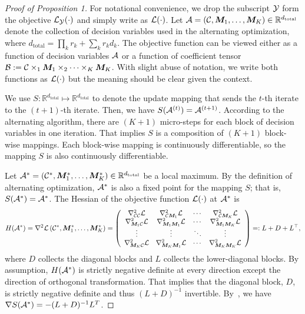\documentclass[11pt]{article}
\theoremstyle{plain}
\theoremstyle{definition}
\begin{document}
\begin{proof}[Proof of Proposition 1]
For notational convenience, we drop the subscript $\mathcal{Y}$ form the objective $\mathcal{L}_{\mathcal{Y}}(\cdot)$ and simply write as $\mathcal{L}(\cdot)$. Let $\mathcal{A} = (\mathcal{C}, \bm M_1,\ldots,\bm M_K) \in \mathbb{R}^{d_{\text{total}}}$ denote the collection of decision variables used in the alternating optimization, where $d_{\text{total}} = \prod_k r_k + \sum_k r_kd_k$. The objective function can be viewed either as a function of decision variables $\mathcal{A}$ or a function of coefficient tensor $\mathcal{B}:=\mathcal{C}\times_1\bm M_1\times_2\cdots \times_K\bm M_K$. With slight abuse of notation, we write both functions as $\mathcal{L}(\cdot)$ but the meaning should be clear given the context. 


We use $S\colon \mathbb{R}^{d_{\text{total}}} \mapsto  \mathbb{R}^{d_{\text{total}}} $ to denote the update mapping that sends the $t$-th iterate to the $(t+1)$-th iterate. Then, we have $S(\mathcal{A}^{(t)}) = \mathcal{A}^{(t+1)}$. According to the alternating algorithm, there are $(K+1)$ micro-steps for each block of decision variables in one iteration. That implies $S$ is a composition of $(K+1)$ block-wise mappings. Each block-wise mapping is continuously differentiable, so the mapping $S$ is also continuously differentiable. 

Let $\mathcal{A}^*=(\mathcal{C}^*, \bm M^*_1,\ldots,\bm M^*_K) \in \mathbb{R}^{d_{\text{total}}}$ be a local maximum. By the definition of alternating optimization, $\mathcal{A}^*$ is also a fixed point for the mapping $S$; that is, $S(\mathcal{A}^*)=\mathcal{A}^*$. The Hessian of the objective function $\mathcal{L}(\cdot)$ at $\mathcal{A}^*$ is
\begin{align*}
    H(\mathcal{A}^*) =  \nabla^2 \mathcal{L}\left(\mathcal{C}^*, \bm M_1^*,\ldots,\bm M_K^* \right) =\left(\begin{array}{cccc}\nabla_{\mathcal{C}\mathcal{C}}^{2} \mathcal{L} &\nabla_{\mathcal{C}\bm M_1}^{2} \mathcal{L}  & \cdots & \nabla_{\mathcal{C}\bm M_K}^{2} \mathcal{L} \\ \nabla_{\bm M_1\mathcal{C}}^{2} \mathcal{L}  &\nabla_{\bm M_1\bm M_1}^{2} \mathcal{L} & \cdots &  \nabla_{\bm M_1 \bm M_K}^{2} \mathcal{L}\\ \vdots & \vdots & \ddots & \vdots \\\nabla_{\bm M_K\mathcal{C}}^{2} \mathcal{L}& \nabla_{\bm M_K \bm M_1}^{2} \mathcal{L} & \cdots & \nabla_{\bm M_K \bm M_K}^{2} \mathcal{L} \end{array}\right)=:L+D+L^{\top},
\end{align*}
where $D$ collects the diagonal blocks and $L$ collects the lower-diagonal blocks. By assumption, $H(\mathcal{A}^*)$ is strictly negative definite at every direction except the direction of orthogonal transformation. That implies that the diagonal block, $D$, is strictly negative definite and thus $(L+ D)^{-1}$ invertible. By~\citep[Lemma 2]{bezdek2003convergence}, we have $\nabla S(\mathcal{A}^*) = -(L+D)^{-1} L^T$.


\end{proof}
\end{document}
